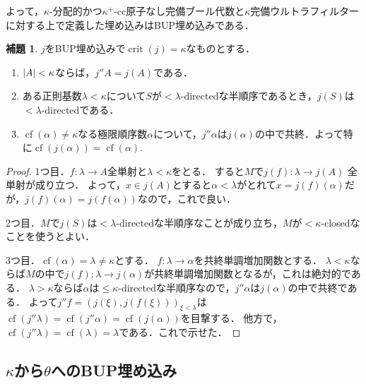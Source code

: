 \documentclass[uplatex,dvipdfmx]{jsarticle}
\newcommand{\cf}{\operatorname{cf}}
\newcommand{\crit}{\operatorname{crit}}
\DeclarePairedDelimiter\abs{\lvert}{\rvert}
\theoremstyle{definition}
\newtheorem{lem}[thm]{補題}
\begin{document}
	よって，$\kappa$-分配的かつ$\kappa^+$-cc原子なし完備ブール代数と$\kappa$完備ウルトラフィルターに対する上で定義した埋め込みはBUP埋め込みである．

	\begin{lem}
		$j$をBUP埋め込みで$\crit(j) = \kappa$なものとする．
		\begin{enumerate}
			\item $\abs{A} < \kappa$ならば，$j''A = j(A)$である．
			\item ある正則基数$\lambda < \kappa$について$S$が${<}\lambda$-directedな半順序であるとき，$j(S)$は${<}\lambda$-directedである．
			\item $\cf(\alpha) \ne \kappa$なる極限順序数$\alpha$について，$j''\alpha$は$j(\alpha)$の中で共終．よって特に$\cf(j(\alpha)) = \cf(\alpha)$.
		\end{enumerate}
	\end{lem}
	\begin{proof}
		1つ目．$f \colon \lambda \to A$全単射と$\lambda < \kappa$をとる．
		すると$M$で$j(f) \colon \lambda \to j(A)$ 全単射が成り立つ．
		よって，$x \in j(A)$とすると$\alpha < \lambda$がとれて$x = j(f)(\alpha)$だが，$j(f)(\alpha) = j(f(\alpha))$なので，これで良い．

		2つ目．$M$で$j(S)$は${<}\lambda$-directedな半順序なことが成り立ち，$M$が${<}\kappa$-closedなことを使うとよい．

		3つ目．$\cf(\alpha) = \lambda \ne \kappa$とする．
		$f \colon \lambda \to \alpha$を共終単調増加関数とする．
		$\lambda < \kappa$ならば$M$の中で$j(f) \colon \lambda \to j(\alpha)$が共終単調増加関数となるが，これは絶対的である．
		$\lambda > \kappa$ならば$\alpha$は${\le}\kappa$-directedな半順序なので，$j''\alpha$は$j(\alpha)$の中で共終である．
		よって$j''f = (j(\xi), j(f(\xi)))_{\xi < \lambda}$は$\cf(j'' \lambda) = \cf(j '' \alpha) = \cf(j(\alpha))$を目撃する．
		他方で，$\cf(j''\lambda) = \cf(\lambda) = \lambda$である．これで示せた．
	\end{proof}

	\subsection{$\kappa$から$\theta$へのBUP埋め込み}
\end{document}
